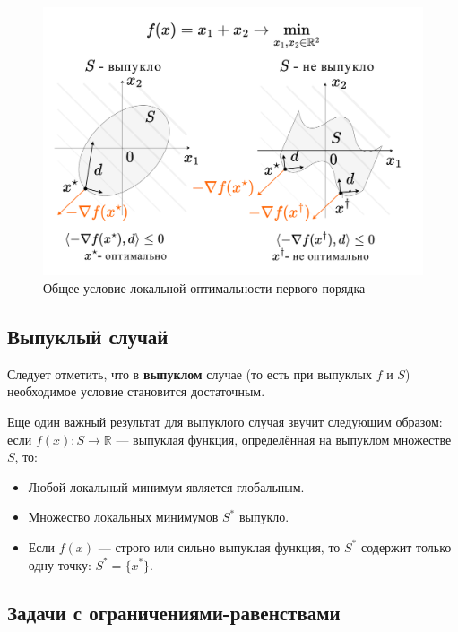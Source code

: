 \documentclass[
  russian,
  letterpaper,
  DIV=11,
  numbers=noendperiod]{scrartcl}
\providecommand{\tightlist}{%
  \setlength{\itemsep}{0pt}\setlength{\parskip}{0pt}}
\begin{document}
\begin{figure}[H]

{\centering \includegraphics[width=0.7\linewidth,height=\textheight,keepaspectratio]{optimality_convexity_ru.pdf}

}

\caption{Общее условие локальной оптимальности первого порядка}

\end{figure}%

\subsection{Выпуклый
случай}\label{ux432ux44bux43fux443ux43aux43bux44bux439-ux441ux43bux443ux447ux430ux439}

Следует отметить, что в \textbf{выпуклом} случае (то есть при выпуклых
\(f\) и \(S\)) необходимое условие становится достаточным.

Еще один важный результат для выпуклого случая звучит следующим образом:
если \(f(x): S \to \mathbb{R}\) --- выпуклая функция, определённая на
выпуклом множестве \(S\), то:

\begin{itemize}
\tightlist
\item
  Любой локальный минимум является глобальным.
\item
  Множество локальных минимумов \(S^*\) выпукло.
\item
  Если \(f(x)\) --- строго или сильно выпуклая функция, то \(S^*\)
  содержит только одну точку: \(S^* = \{x^*\}\).
\end{itemize}

\subsection{Задачи с
ограничениями-равенствами}\label{ux437ux430ux434ux430ux447ux438-ux441-ux43eux433ux440ux430ux43dux438ux447ux435ux43dux438ux44fux43cux438-ux440ux430ux432ux435ux43dux441ux442ux432ux430ux43cux438}
\end{document}
